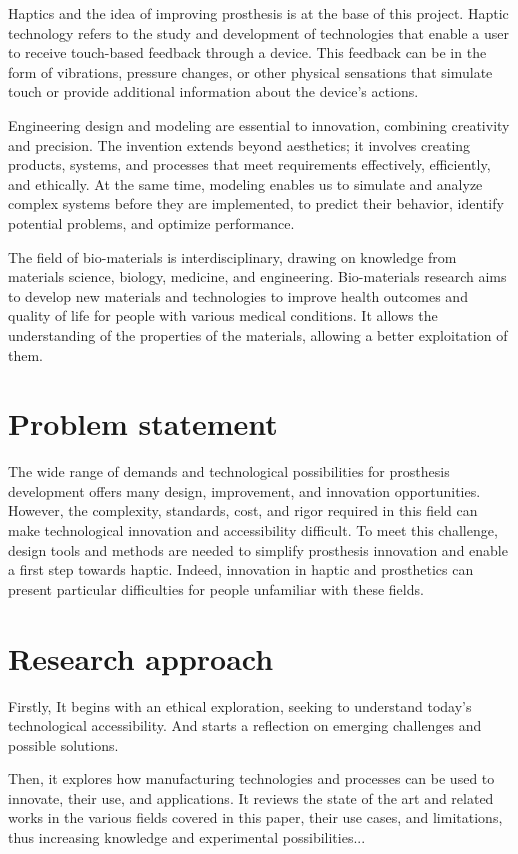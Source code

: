 Haptics and the idea of improving prosthesis is at the base of this project. Haptic technology refers to the study and development of technologies that enable a user to receive touch-based feedback through a device. This feedback can be in the form of vibrations, pressure changes, or other physical sensations that simulate touch or provide additional information about the device's actions.

Engineering design and modeling are essential to innovation, combining creativity and precision. The invention extends beyond aesthetics; it involves creating products, systems, and processes that meet requirements effectively, efficiently, and ethically. At the same time, modeling enables us to simulate and analyze complex systems before they are implemented, to predict their behavior, identify potential problems, and optimize performance.

The field of bio-materials is interdisciplinary, drawing on knowledge from materials science, biology, medicine, and engineering. Bio-materials research aims to develop new materials and technologies to improve health outcomes and quality of life for people with various medical conditions. It allows the understanding of the properties of the materials, allowing a better exploitation of them.

\section{Problem statement}
The wide range of demands and technological possibilities for prosthesis development offers many design, improvement, and innovation opportunities. However, the complexity, standards, cost, and rigor required in this field can make technological innovation and accessibility difficult. To meet this challenge, design tools and methods are needed to simplify prosthesis innovation and enable a first step towards haptic. Indeed, innovation in haptic and prosthetics can present particular difficulties for people unfamiliar with these fields.

\section{Research approach}
Firstly, It begins with an ethical exploration, seeking to understand today's technological accessibility. And starts a reflection on emerging challenges and possible solutions.

Then, it explores how manufacturing technologies and processes can be used to innovate, their use, and applications. It reviews the state of the art and related works in the various fields covered in this paper, their use cases, and limitations, thus increasing knowledge and experimental possibilities...

